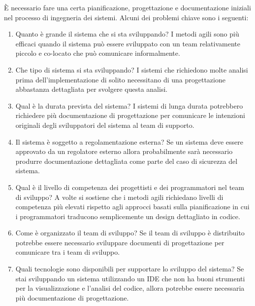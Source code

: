 È necessario fare una certa pianificazione, progettazione e documentazione iniziali nel processo di ingegneria dei sistemi. Alcuni dei problemi chiave sono i seguenti:
\begin{enumerate}
    \item Quanto è grande il sistema che si sta sviluppando? I metodi agili sono più efficaci quando il sistema può essere sviluppato con un team relativamente piccolo e co-locato che può comunicare informalmente.
    \item Che tipo di sistema si sta sviluppando? I sistemi che richiedono molte analisi prima dell'implementazione di solito necessitano di una progettazione abbastanza dettagliata per svolgere questa analisi.
    \item Qual è la durata prevista del sistema? I sistemi di lunga durata potrebbero richiedere più documentazione di progettazione per comunicare le intenzioni originali degli sviluppatori del sistema al team di supporto.
    \item Il sistema è soggetto a regolamentazione esterna? Se un sistema deve essere approvato da un regolatore esterno allora probabilmente sarà necessario produrre documentazione dettagliata come parte del caso di sicurezza del sistema.
    \item Qual è il livello di competenza dei progettisti e dei programmatori nel team di sviluppo? A volte si sostiene che i metodi agili richiedano livelli di competenza più elevati rispetto agli approcci basati sulla pianificazione in cui i programmatori traducono semplicemente un design dettagliato in codice.
    \item Come è organizzato il team di sviluppo? Se il team di sviluppo è distribuito potrebbe essere necessario sviluppare documenti di progettazione per comunicare tra i team di sviluppo.
    \item Quali tecnologie sono disponibili per supportare lo sviluppo del sistema? Se stai sviluppando un sistema utilizzando un IDE che non ha buoni strumenti per la visualizzazione e l'analisi del codice, allora potrebbe essere necessaria più documentazione di progettazione.
\end{enumerate}

